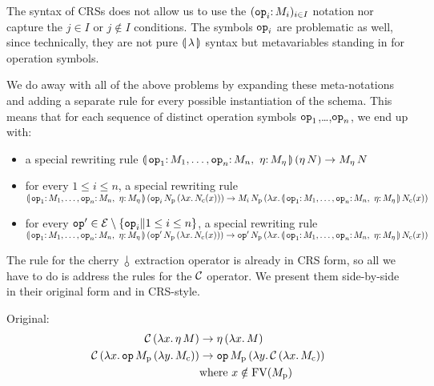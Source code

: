 The syntax of CRSs does not allow us to use the $(\onto{\op{op}_i}{M_i})_{i
  \in I}$ notation nor capture the $j \in I$ or $j \notin I$ conditions.
The symbols $\mathtt{op}_i$ are problematic as well, since technically, they
are not pure $\llparenthesis \, \lambda \, \rrparenthesis$ syntax but metavariables standing in for
operation symbols.

We do away with all of the above problems by expanding these meta-notations
and adding a separate rule for every possible instantiation of the
schema. This means that for each sequence of distinct operation symbols
$\mathtt{op}_1$,\ldots,$\mathtt{op}_n$, we end up with:
\begin{itemize}
\item a special rewriting rule
  $\ap{\banana{\onto{\op{op}_1}{M_1},\ldots,\onto{\op{op}_n}{M_n},\ 
    \onto{\eta}{M_\eta}}}{(\etaE{N})}
  \to \ap{M_\eta}{N}$
\item for every $1 \le i \le n$, a special rewriting rule \\
  $\ap{\banana{\onto{\op{op}_1}{M_1},\ldots,\onto{\op{op}_n}{M_n},\ 
    \onto{\eta}{M_\eta}}}{(\app{\op{op}_i}{N_{\mathrm{p}}}{(\lam{x}{N_{\mathrm{c}}(x)})})}
  \\ \to
  \app{M_i}{N_{\mathrm{p}}}{(\lam{x}{\ap{\banana{\onto{\op{op}_1}{M_1},\ldots,\onto{\op{op}_n}{M_n},\ \onto{\eta}{M_\eta}}}{N_{\mathrm{c}}(x)}})}$
\item for every $\mathtt{op}' \in \mathcal{E} \setminus \{\mathtt{op}_i \| 1 \le i \le n\}$, a special
  rewriting rule \\
  $\ap{\banana{\onto{\op{op}_1}{M_1},\ldots,\onto{\op{op}_n}{M_n},\ 
    \onto{\eta}{M_\eta}}}{(\app{\op{op}'}{N_{\mathrm{p}}}{(\lam{x}{N_{\mathrm{c}}(x)})})}
  \\ \to
  \app{\op{op}'}{N_{\mathrm{p}}}{(\lam{x}{\ap{\banana{\onto{\op{op}_1}{M_1},\ldots,\onto{\op{op}_n}{M_n},\ \onto{\eta}{M_\eta}}}{N_{\mathrm{c}}(x)}})}$
\end{itemize}

The rule for the cherry $\cherry$ extraction operator is already in CRS
form, so all we have to do is address the rules for the $\mathcal{C}$ operator. We
present them side-by-side in their original form and in CRS-style.

Original:
\begin{align*}
  \mathcal{C}\,(\lambda x.\, \eta\,M) & \to \eta\,(\lambda x.\, M) \\
  \mathcal{C}\,(\lambda x.\, \mathtt{op}\,M_{\mathrm{p}}\,(\lambda y.\, M_{\mathrm{c}}))
  & \to
  \mathtt{op}\,M_{\mathrm{p}}\,(\lambda y.\, \mathcal{C}\,(\lambda x.\, M_{\mathrm{c}})) \\
  & \mathrm{where\ } x \notin \operatorname{FV}(M_{\mathrm{p}})
\end{align*}

